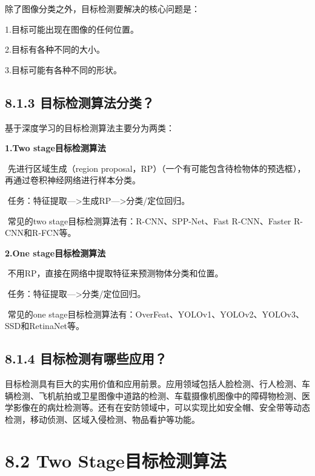 除了图像分类之外，目标检测要解决的核心问题是：

1.目标可能出现在图像的任何位置。

2.目标有各种不同的大小。

3.目标可能有各种不同的形状。

\subsection{8.1.3
目标检测算法分类？}\label{ux76eeux6807ux68c0ux6d4bux7b97ux6cd5ux5206ux7c7b}

基于深度学习的目标检测算法主要分为两类：

\textbf{1.Two stage目标检测算法}

​ 先进行区域生成（region
proposal，RP）（一个有可能包含待检物体的预选框），再通过卷积神经网络进行样本分类。

​ 任务：特征提取---\textgreater{}生成RP---\textgreater{}分类/定位回归。

​ 常见的two stage目标检测算法有：R-CNN、SPP-Net、Fast R-CNN、Faster
R-CNN和R-FCN等。

\textbf{2.One stage目标检测算法}

​ 不用RP，直接在网络中提取特征来预测物体分类和位置。

​ 任务：特征提取---\textgreater{}分类/定位回归。

​ 常见的one
stage目标检测算法有：OverFeat、YOLOv1、YOLOv2、YOLOv3、SSD和RetinaNet等。

\begin{figure}
\centering
\caption{}
\end{figure}

\subsection{8.1.4
目标检测有哪些应用？}\label{ux76eeux6807ux68c0ux6d4bux6709ux54eaux4e9bux5e94ux7528}

​
目标检测具有巨大的实用价值和应用前景。应用领域包括人脸检测、行人检测、车辆检测、飞机航拍或卫星图像中道路的检测、车载摄像机图像中的障碍物检测、医学影像在的病灶检测等。还有在安防领域中，可以实现比如安全帽、安全带等动态检测，移动侦测、区域入侵检测、物品看护等功能。

\section{8.2 Two
Stage目标检测算法}\label{two-stageux76eeux6807ux68c0ux6d4bux7b97ux6cd5}

